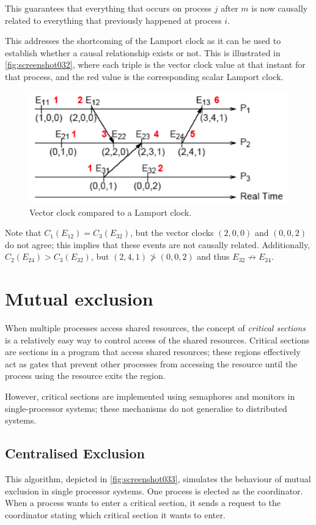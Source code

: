 This guarantees that everything that occurs on process $j$ after $m$ is now causally related to everything that previously happened at process $i$.

This addresses the shortcoming of the Lamport clock as it can be used to establish whether a causal relationship exists or not. This is illustrated in \autoref{fig:screenshot032}, where each triple is the vector clock value at that instant for that process, and the red value is the corresponding scalar Lamport clock.

\begin{figure}
\centering
\includegraphics[width=0.7\linewidth]{screenshot032}
\caption{Vector clock compared to a Lamport clock.}
\label{fig:screenshot032}
\end{figure}


Note that $C_1(E_{12}) = C_3(E_{32})$, but the vector clocks $(2, 0, 0)$ and $(0, 0, 2)$ do not agree; this implies that these events are not causally related. Additionally, $C_2(E_{24}) > C_3(E_{32})$, but $(2, 4, 1) \not> (0, 0, 2)$ and thus $E_{32} \not\rightarrow E_{24}$.

\section{Mutual exclusion}
When multiple processes access shared resources, the concept of \textit{critical sections} is a relatively easy way to control access of the shared resources. Critical sections are sections in a program that access shared resources; these regions effectively act as gates that prevent other processes from accessing the resource until the process using the resource exits the region.

However, critical sections are implemented using semaphores and monitors in single-processor systems; these mechanisms do not generalise to distributed systems.

\subsection{Centralised Exclusion}
This algorithm, depicted in \autoref{fig:screenshot033}, simulates the behaviour of mutual exclusion in single processor systems. One process is elected as the coordinator. When a process wants to enter a critical section, it sends a request to the coordinator stating which critical section it wants to enter.

